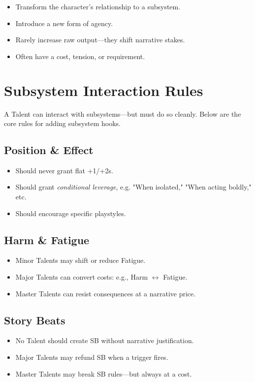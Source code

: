 \documentclass[11pt]{book}
\begin{document}
\begin{itemize}
    \item Transform the character's relationship to a subsystem.
    \item Introduce a new form of agency.
    \item Rarely increase raw output---they shift narrative stakes.
    \item Often have a cost, tension, or requirement.
\end{itemize}

\section{Subsystem Interaction Rules}

A Talent can interact with subsystems---but must do so cleanly.
Below are the core rules for adding subsystem hooks.

\subsection{Position \& Effect}

\begin{itemize}
    \item Should never grant flat +1/+2s.  
    \item Should grant \emph{conditional leverage}, e.g. "When isolated," "When acting boldly," etc.
    \item Should encourage specific playstyles.
\end{itemize}

\subsection{Harm \& Fatigue}

\begin{itemize}
    \item Minor Talents may shift or reduce Fatigue.
    \item Major Talents can convert costs: e.g., Harm $\leftrightarrow$ Fatigue.
    \item Master Talents can resist consequences at a narrative price.
\end{itemize}

\subsection{Story Beats}

\begin{itemize}
    \item No Talent should create SB without narrative justification.
    \item Major Talents may refund SB when a trigger fires.
    \item Master Talents may break SB rules---but always at a cost.
\end{itemize}
\end{document}
